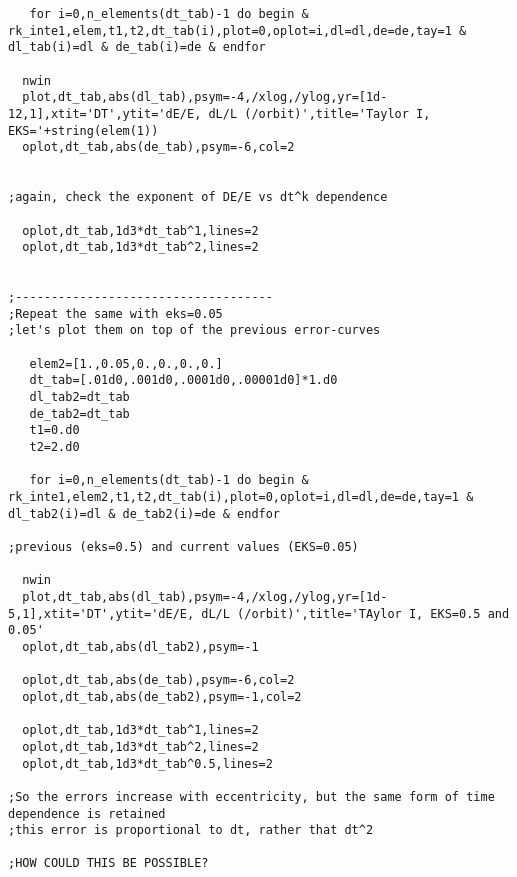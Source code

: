 \documentclass[12pt,landscape]{article}
\begin{document}
\begin{verbatim}
   for i=0,n_elements(dt_tab)-1 do begin &  rk_inte1,elem,t1,t2,dt_tab(i),plot=0,oplot=i,dl=dl,de=de,tay=1 & dl_tab(i)=dl & de_tab(i)=de & endfor

  nwin
  plot,dt_tab,abs(dl_tab),psym=-4,/xlog,/ylog,yr=[1d-12,1],xtit='DT',ytit='dE/E, dL/L (/orbit)',title='Taylor I, EKS='+string(elem(1))
  oplot,dt_tab,abs(de_tab),psym=-6,col=2


;again, check the exponent of DE/E vs dt^k dependence

  oplot,dt_tab,1d3*dt_tab^1,lines=2
  oplot,dt_tab,1d3*dt_tab^2,lines=2


;------------------------------------
;Repeat the same with eks=0.05
;let's plot them on top of the previous error-curves

   elem2=[1.,0.05,0.,0.,0.,0.]
   dt_tab=[.01d0,.001d0,.0001d0,.00001d0]*1.d0
   dl_tab2=dt_tab
   de_tab2=dt_tab
   t1=0.d0
   t2=2.d0

   for i=0,n_elements(dt_tab)-1 do begin &  rk_inte1,elem2,t1,t2,dt_tab(i),plot=0,oplot=i,dl=dl,de=de,tay=1 & dl_tab2(i)=dl & de_tab2(i)=de & endfor

;previous (eks=0.5) and current values (EKS=0.05)

  nwin
  plot,dt_tab,abs(dl_tab),psym=-4,/xlog,/ylog,yr=[1d-5,1],xtit='DT',ytit='dE/E, dL/L (/orbit)',title='TAylor I, EKS=0.5 and 0.05'
  oplot,dt_tab,abs(dl_tab2),psym=-1

  oplot,dt_tab,abs(de_tab),psym=-6,col=2
  oplot,dt_tab,abs(de_tab2),psym=-1,col=2

  oplot,dt_tab,1d3*dt_tab^1,lines=2
  oplot,dt_tab,1d3*dt_tab^2,lines=2
  oplot,dt_tab,1d3*dt_tab^0.5,lines=2

;So the errors increase with eccentricity, but the same form of time dependence is retained
;this error is proportional to dt, rather that dt^2

;HOW COULD THIS BE POSSIBLE?


\end{verbatim}
\end{document}
